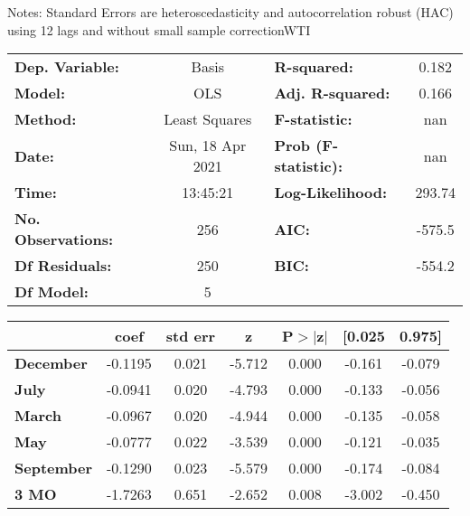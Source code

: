 Notes: \newline
 [1] Standard Errors are heteroscedasticity and autocorrelation robust (HAC) using 12 lags and without small sample correctionWTI\begin{center}
\begin{tabular}{lclc}
\toprule
\textbf{Dep. Variable:}    &      Basis       & \textbf{  R-squared:         } &     0.182   \\
\textbf{Model:}            &       OLS        & \textbf{  Adj. R-squared:    } &     0.166   \\
\textbf{Method:}           &  Least Squares   & \textbf{  F-statistic:       } &       nan   \\
\textbf{Date:}             & Sun, 18 Apr 2021 & \textbf{  Prob (F-statistic):} &      nan    \\
\textbf{Time:}             &     13:45:21     & \textbf{  Log-Likelihood:    } &    293.74   \\
\textbf{No. Observations:} &         256      & \textbf{  AIC:               } &    -575.5   \\
\textbf{Df Residuals:}     &         250      & \textbf{  BIC:               } &    -554.2   \\
\textbf{Df Model:}         &           5      & \textbf{                     } &             \\
\bottomrule
\end{tabular}
\begin{tabular}{lcccccc}
                   & \textbf{coef} & \textbf{std err} & \textbf{z} & \textbf{P$> |$z$|$} & \textbf{[0.025} & \textbf{0.975]}  \\
\midrule
\textbf{December}  &      -0.1195  &        0.021     &    -5.712  &         0.000        &       -0.161    &       -0.079     \\
\textbf{July}      &      -0.0941  &        0.020     &    -4.793  &         0.000        &       -0.133    &       -0.056     \\
\textbf{March}     &      -0.0967  &        0.020     &    -4.944  &         0.000        &       -0.135    &       -0.058     \\
\textbf{May}       &      -0.0777  &        0.022     &    -3.539  &         0.000        &       -0.121    &       -0.035     \\
\textbf{September} &      -0.1290  &        0.023     &    -5.579  &         0.000        &       -0.174    &       -0.084     \\
\textbf{3 MO}      &      -1.7263  &        0.651     &    -2.652  &         0.008        &       -3.002    &       -0.450     \\

\end{tabular}
\end{center}
